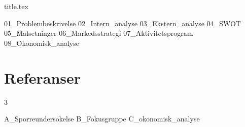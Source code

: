 \documentclass[11pt, twoside]{article}
\begin{document}
\frontmatter
\pagestyle{empty}
{title.tex}
\pagestyle{fancy}

\tableofcontents
\listoftables
\listoffigures

\mainmatter


{01_Problembeskrivelse}
{02_Intern_analyse}
{03_Ekstern_analyse}
{04_SWOT}
{05_Malsetninger}
{06_Markedsstrategi}
{07_Aktivitetsprogram}
{08_Okonomisk_analyse}

\newpage
{}
\begingroup
\fontsize{8}{8.4}\selectfont
\sloppy
\setlength{\bibitemsep}{5pt plus 1pt minus 0.5pt}
\setlength{\bibinitsep}{6pt plus 1pt minus 1pt}
\setlength{\bibhang}{0pt}
\setlength{\columnsep}{6pt}
\setlength{\multicolsep}{0pt}
\renewcommand*{\bibfont}{\normalfont\fontsize{8}{8.4}\selectfont\raggedright}
\section*{Referanser}
\begin{multicols*}{3}
\printbibliography[heading=none]
\end{multicols*}
\endgroup
\restoregeometry

\addappendix
{A_Sporreundersokelse}
{B_Fokusgruppe}
{C_okonomisk_analyse}
\end{document}
